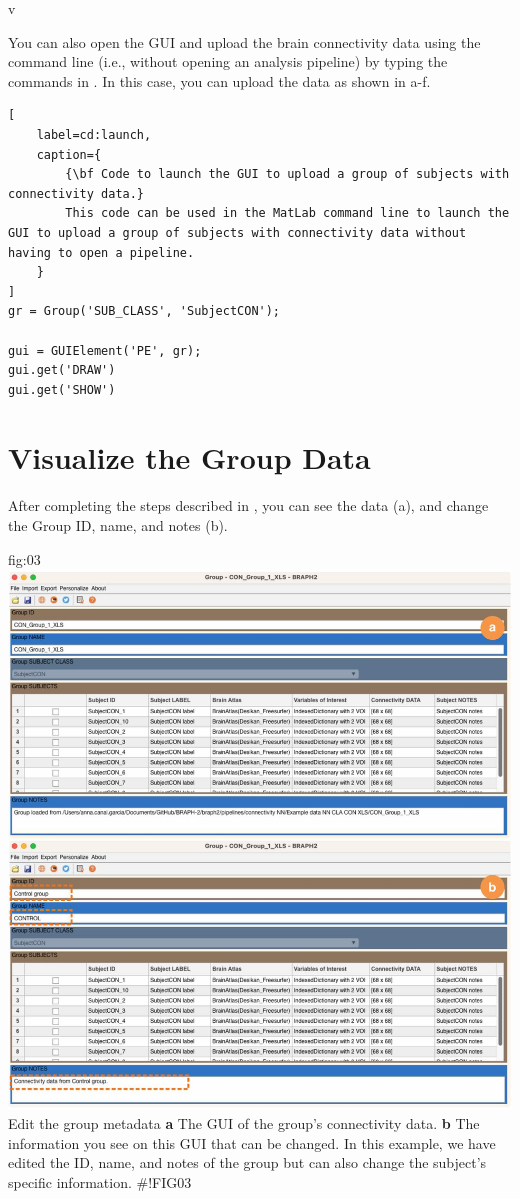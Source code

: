 v\documentclass[justified]{tufte-handout}
\begin{document}
\begin{tcolorbox}[
	title=GUI launch from command line
]
You can also open the GUI and upload the brain connectivity data using the command line (i.e., without opening an analysis pipeline) by typing the commands in . In this case, you can upload the data as shown in a-f.
%
\begin{lstlisting}[
	label=cd:launch,
	caption={
		{\bf Code to launch the GUI to upload a group of subjects with connectivity data.}
		This code can be used in the MatLab command line to launch the GUI to upload a group of subjects with connectivity data without having to open a pipeline.
	}
]
gr = Group('SUB_CLASS', 'SubjectCON');

gui = GUIElement('PE', gr);
gui.get('DRAW')
gui.get('SHOW')
\end{lstlisting}
\end{tcolorbox}

\section{Visualize the Group Data}

After completing the steps described in , you can see the data (a), and change the Group ID, name, and notes (b). 

	{fig:03}
	{
	\includegraphics{fig03.jpg}
	}
	{Edit the group metadata}
	{ 
	{\bf a} The GUI of the group's connectivity data. 
	{\bf b} The information you see on this GUI that can be changed. In this example, we have edited the ID, name, and notes of the group but can also change the subject's specific information.
	}
#!FIG03
\end{document}

